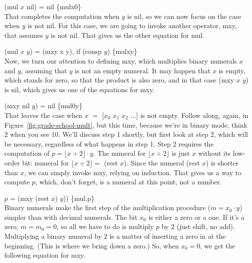 \hspace*{2cm} (mul $x$ nil) = nil \hspace{2cm} \hfill \{mulx0\}
\\

That completes the computation when $y$ is nil, 
so we can now focus on the case when $y$ is not nil.
For this case, we are going to invoke another operator, mxy,
that assumes $y$ is not nil. That gives us the other equation
for mul.

\hspace*{2cm} (mul $x$ $y$) = (mxy x y), if (consp $y$) \hfill \{mulxy\}
\\

Now, we turn our attention to defining mxy, which multiplies binary
numerals $x$ and $y$, assuming that $y$ is not an empty numeral.
It may happen that $x$ is empty, which stands for zero, so that
the product is also zero, and in that case (mxy $x$ $y$) is nil, 
which gives us one of the equations for mxy.

\hspace*{2cm} (mxy nil $y$) = nil  \hfill \{mul0y\}
\\

That leaves the case when $x$ $=$ [$x_0$ $x_1$ $x_2$ ...] is not empty.
Follow along, again, in Figure~\ref{fig:grade-school-mult}, 
but this time, because we're in binary mode, think $2$ when you see $10$.
We'll discuss step 1 shortly, but first look at step 2, 
which will be necessary, regardless of what happens in step 1.
Step 2 requires the computation of 
$p = \lfloor x \div 2 \rfloor \cdot y$.
The numeral for $\lfloor x \div 2 \rfloor$ is just $x$ without its
low-order bit: numeral for $\lfloor x \div 2 \rfloor =$ (rest $x$).
Since the numeral (rest $x$) is shorter than $x$,
we can simply invoke mxy, relying on induction.
That gives us a way to compute $p$, which, don't forget,
is a numeral at this point, not a number.

\hspace*{2cm} $p$ = (mxy (rest $x$) $y$)) \hfill \{mul.p\}
\\

Binary numerals make the first step of the
multiplication procedure ($m = x_0 \cdot y$) 
simpler than with decimal numerals.
The bit $x_0$ is either a zero or a one.
If it's a zero, $m = m_0 = 0$, so all
we have to do is multiply $p$ by $2$ (just shift, no add).
Multiplying a binary numeral by $2$ is a matter
of inserting a zero in at the beginning.
(This is where we bring down a zero.)
So, when $x_0 = 0$, we get the following equation for mxy.

